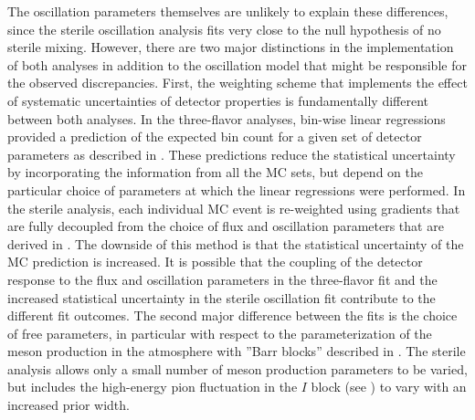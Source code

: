 The oscillation parameters themselves are unlikely to explain these differences, since the sterile oscillation analysis fits very close to the null hypothesis of no sterile mixing.
However, there are two major distinctions in the implementation of both analyses in addition to the oscillation model that might be responsible for the observed discrepancies.
First, the weighting scheme that implements the effect of systematic uncertainties of detector properties is fundamentally different between both analyses.
In the three-flavor analyses, bin-wise linear regressions provided a prediction of the expected bin count for a given set of detector parameters as described in .
These predictions reduce the statistical uncertainty by incorporating the information from all the MC sets, but depend on the particular choice of parameters at which the linear regressions were performed.
In the sterile analysis, each individual MC event is re-weighted using gradients that are fully decoupled from the choice of flux and oscillation parameters that are derived in .
The downside of this method is that the statistical uncertainty of the MC prediction is increased.
It is possible that the coupling of the detector response to the flux and oscillation parameters in the three-flavor fit and the increased statistical uncertainty in the sterile oscillation fit contribute to the different fit outcomes.
The second major difference between the fits is the choice of free parameters, in particular with respect to the parameterization of the meson production in the atmosphere with ''Barr blocks'' described in .
The sterile analysis allows only a small number of meson production parameters to be varied, but includes the high-energy pion fluctuation in the $I$ block (see ) to vary with an increased prior width.

